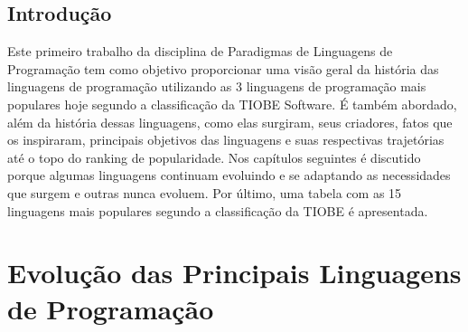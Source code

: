 \documentclass[
    12pt,               %
    openany,            %
    twoside,            %
    a4paper,            %
    brazil              %
    ]{abntex2}
\begin{document}
\frenchspacing 


\imprimircapa

\imprimirfolhaderosto*

\clearpage
{}
\tableofcontents*
\cleardoublepage



\textual

\chapter*[Introdução]{Introdução}

Este primeiro trabalho da disciplina de Paradigmas de Linguagens de Programação
tem como objetivo proporcionar uma visão geral da história das linguagens de
programação utilizando as 3 linguagens de programação mais populares hoje 
segundo a classificação da TIOBE Software. É também abordado, além da história dessas
linguagens, como elas surgiram, seus criadores, fatos que os inspiraram, principais
objetivos das linguagens e suas respectivas trajetórias até o topo do ranking de
popularidade.
Nos capítulos seguintes é discutido porque algumas linguagens continuam
evoluindo e se adaptando as necessidades que surgem e outras nunca evoluem.
Por último, uma tabela com as 15 linguagens mais populares segundo a
classificação da TIOBE é apresentada.

\part{Evolução das Principais Linguagens de Programação}
\end{document}
